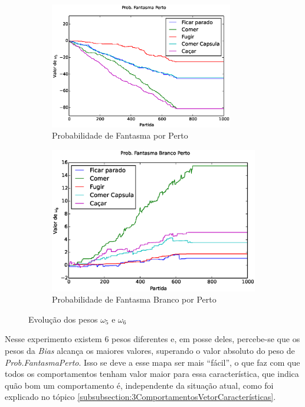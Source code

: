 \begin{figure}[h]
	\centering
	\begin{subfigure}[t]{.5\textwidth}
		\centering
		\includegraphics[width=80mm]{images/5_behaviors_original_map/weights____pol__ProbExistirFantBranco}
		\caption{Probabilidade de Fantasma por Perto}
		\label{img:5ComportamentosMapaOriginal:PesoProbFantasmaPorPerto}
	\end{subfigure}%
	\begin{subfigure}[t]{.5\textwidth}
		\centering
		\includegraphics[width=\linewidth]{images/5_behaviors_original_map/weights____pol__ProbFantasmaPerto}
		\caption{Probabilidade de Fantasma Branco por Perto}
	\label{img:5ComportamentosMapaOriginal:PesoProbFantasmaBrancoPorPerto}
	\end{subfigure}
	\caption{Evolução dos pesos $ \omega_5 $ e $ \omega_6 $}
	\label{img:5ComportamentosMapaOriginal:PesoProbFantasmaBrancoExistirOuNormalPerto}
\end{figure}

Nesse experimento existem 6 pesos diferentes e, em posse deles, percebe-se que os pesos da \textit{Bias} alcança os maiores valores, superando o valor absoluto do peso de \textit{Prob.FantasmaPerto}. Isso se deve a esse mapa ser mais ``fácil'', o que faz com que todos os comportamentos tenham valor maior para essa característica, que indica quão bom um comportamento é, independente da situação atual, como foi explicado no tópico \ref{subsubsection:3ComportamentosVetorCaracterísticas}.

